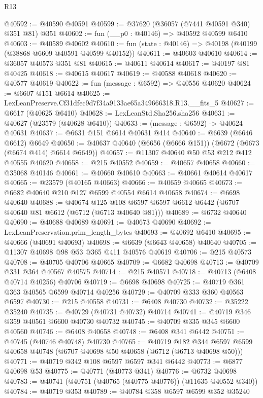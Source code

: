 \begin{lexlean}{R13}
\begin{coremodule}
@40592 := @40590 @40591
@40599 := @37620 (@36057 (@7441 @40591 @340) @351 @81) @351
@40602 := fun (__p0 : @40146) => @40592 @40599 @6410
@40603 := @40589 @40602
@40610 := fun (state : @40146) => @40198 (@40199 (@38868 @6609 @40591 @40599 @40152))
@40611 := @40603 @40610
@40614 := @36057 @40573 @351 @81
@40615 := @40611 @40614
@40617 := @40197 @81 @40425
@40618 := @40615 @40617
@40619 := @40588 @40618
@40620 := @40577 @40619
@40622 := fun (message : @6592) => @40556 @40620
@40624 := @6607 @151 @6614
@40625 := LexLeanPreserve.Cf31dfec9d7f34a9133ae65a349666318.R13.__fits_5
@40627 := @6617 (@40625 @6410)
@40628 := LexLeanStd.Sha256.sha256
@40631 := @40627 (@23579 (@40628 @6410))
@40633 := (message : @6592) -> @40624 @40631
@40637 := @6631 @151 @6614 @40631 @414
@40640 := @6639 (@6646 @6612) @6649
@40650 := @40637 @40640 (@6656 (@6666 @151)) (@6672 (@6673 (@6674 @414) @6614 @6649))
@40657 := @11307 @40640 @50 @53 @212 @412 @40555 @40620
@40658 := @215 @40552
@40659 := @40657 @40658
@40660 := @35068 @40146
@40661 := @40660 @40610
@40663 := @40661 @40614 @40617
@40665 := @23579 (@40165 @40663)
@40666 := @40659 @40665
@40673 := @6682 @40640 @210 @127 @6599 @40554 @6614 @40658
@40674 := @6698 @40640
@40688 := @40674
    @125
    @108
    @6597
    @6597
    @6612
    @6442
    (@6707 @40640 @81 @6612 (@6712 (@6713 @40640 @81)))
@40689 := @6732 @40640
@40690 := @40688 @40689
@40691 := @40673 @40690
@40692 := LexLeanPreservation.prim_length_bytes
@40693 := @40692 @6410
@40695 := @40666 (@40691 @40693)
@40698 := @6639 (@6643 @40658) @40640
@40705 := @11307 @40698 @98 @53 @365 @411 @40576 @40619
@40706 := @215 @40573
@40708 := @40705 @40706 @40665
@40709 := @6682 @40698
@40713 := @40709 @331 @364 @40567 @40575
@40714 := @215 @40571
@40718 := @40713 (@6408 @40714 @40256) @40706
@40719 := @6698 @40698
@40725 := @40719 @361 @363 @40565 @6599 @40714 @40256
@40729 := @40709 @333 @360 @40563 @6597
@40730 := @215 @40558
@40731 := @6408 @40730
@40732 := @35222 @35240
@40735 := @40729 (@40731 @40732) @40714
@40741 := @40719 @346 @359 @40561 @6600 @40730 @40732
@40745 := @40709 @335 @345 @6600 @40560
@40746 := @6408 @40658
@40748 := @6408 @341 @6442
@40751 := @40745 (@40746 @40748) @40730
@40765 := @40719
    @182
    @344
    @6597
    @6599
    @40658
    @40748
    (@6707 @40698 @50 @40658 (@6712 (@6713 @40698 @50)))
@40771 := @40719 @342 @108 @6597 @6597 @341 @6442
@40773 := @6877 @40698 @53
@40775 := @40771 (@40773 @341)
@40776 := @6732 @40698
@40783 := @40741 (@40751 (@40765 (@40775 @40776)) (@11635 @40552 @340))
@40784 := @40719 @353
@40789 := @40784 @358 @6597 @6599 @352 @35240

\end{coremodule}
\end{lexlean}
